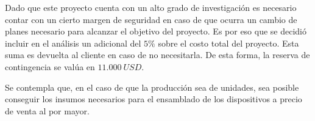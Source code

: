 Dado que este proyecto cuenta con un alto grado de investigación es necesario contar con un cierto margen de seguridad en caso de que ocurra un cambio de planes necesario para alcanzar el objetivo del proyecto. Es por eso que se decidió incluir en el análisis un adicional del $5\%$ sobre el costo total del proyecto. Esta suma es devuelta al cliente en caso de no necesitarla. De esta forma, la reserva de contingencia se valúa en $11.000 \ USD$.

Se contempla que, en el caso de que la producción sea de \unidadespostfin unidades, sea posible conseguir los insumos necesarios para el ensamblado de los dispositivos a precio de venta al por mayor.
